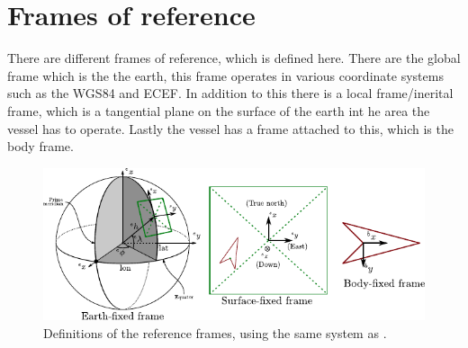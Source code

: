 \section{Frames of reference}
There are different frames of reference, which is defined here. There are the global frame which is the the earth, this frame operates in various coordinate systems such as the \ac{WGS84} and \ac{ECEF}. In addition to this there is a local frame/inerital frame, which is a tangential plane on the surface of the earth int he area the vessel has to operate. Lastly the vessel has a frame attached to this, which is the body frame.

\begin{figure}[htbp]
	\centering
	\includegraphics[width=\textwidth]{img/reference_frames}
	\caption{Definitions of the reference frames, using the same system as \cite{argo}.}
	\label{fig:vessel-block-overview}
\end{figure}

